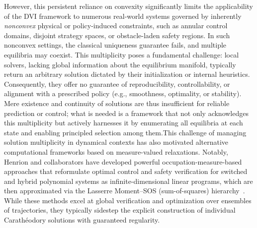 \documentclass[sn-basic,Numbered]{sn-jnl}
\theoremstyle{thmstyleone}%
\begin{document}
However, this persistent reliance on convexity significantly limits the applicability of the DVI framework to numerous real-world systems governed by inherently \emph{nonconvex} physical or policy-induced constraints, such as annular control domains, disjoint strategy spaces, or obstacle-laden safety regions. In such nonconvex settings, the classical uniqueness guarantee fails, and multiple equilibria may coexist. This multiplicity poses a fundamental challenge: local solvers, lacking global information about the equilibrium manifold, typically return an arbitrary solution dictated by their initialization or internal heuristics. Consequently, they offer no guarantee of reproducibility, controllability, or alignment with a prescribed policy (e.g., smoothness, optimality, or stability). Mere existence and continuity of solutions are thus insufficient for reliable prediction or control; what is needed is a framework that not only acknowledges this multiplicity but actively harnesses it by enumerating all equilibria at each state and enabling principled selection among them.This challenge of managing solution multiplicity in dynamical contexts has also motivated alternative computational frameworks based on measure-valued relaxations. Notably, Henrion and collaborators have developed powerful occupation-measure-based approaches that reformulate optimal control and safety verification for switched and hybrid polynomial systems as infinite-dimensional linear programs, which are then approximated via the Lasserre Moment--SOS (sum-of-squares) hierarchy~\cite{Claeys2016,Henrion2013switching}. While these methods excel at global verification and optimization over ensembles of trajectories, they typically sidestep the explicit construction of individual Carath\'{e}odory solutions with guaranteed regularity.
\end{document}
